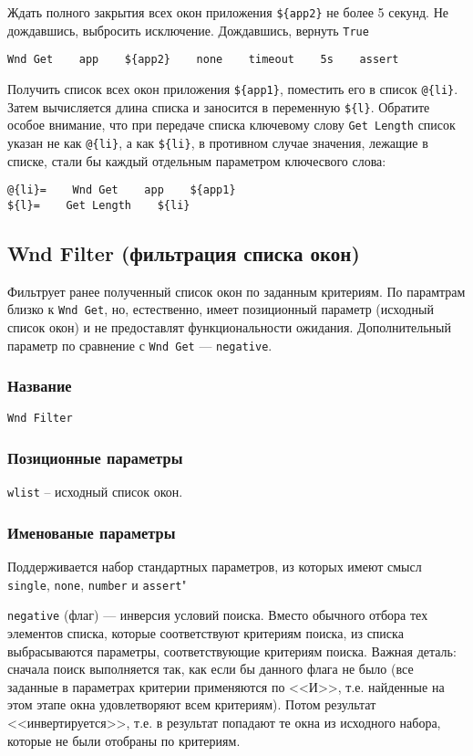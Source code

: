 \documentclass[11pt]{book} %
\begin{document}
Ждать полного закрытия всех окон приложения \verb"${app2}" не более 5 секунд. Не дождавшись, выбросить исключение. Дождавшись, вернуть \verb"True"
\begin{verbatim}
Wnd Get    app    ${app2}    none    timeout    5s    assert
\end{verbatim}

Получить список всех окон приложения \verb"${app1}", поместить его в список \verb"@{li}". Затем вычисляется длина списка и заносится в переменную \verb"${l}". Обратите особое внимание, что при передаче списка ключевому слову \verb"Get Length" список указан не как \verb"@{li}", а как \verb"${li}", в противном случае значения, лежащие в списке, стали бы каждый отдельным параметром ключесвого слова:
\begin{verbatim}
@{li}=    Wnd Get    app    ${app1}
${l}=    Get Length    ${li}
\end{verbatim}



\subsection{Wnd Filter (фильтрация списка окон)}
Фильтрует ранее полученный список окон по заданным критериям. По парамтрам близко к \verb"Wnd Get", но, естественно, имеет позиционный параметр (исходный список окон) и не предоставлят функциональности ожидания. Дополнительный параметр по сравнение с \verb"Wnd Get" --- \verb"negative".

\subsubsection*{Название}
\verb"Wnd Filter"

\subsubsection*{Позиционные параметры} 

\verb"wlist" -- исходный список окон.

\subsubsection*{Именованые параметры} 

Поддерживается набор стандартных параметров, из которых имеют смысл \verb"single", \verb|none|, \verb|number| и \verb"assert""


\verb"negative" (флаг) --- инверсия условий поиска. Вместо обычного отбора тех элементов списка, которые соответствуют критериям поиска, из списка выбрасываются параметры, соответствующие критериям поиска. Важная деталь: сначала поиск выполняется так, как если бы данного флага не было (все заданные в параметрах критерии применяются по <<И>>, т.е. найденные на этом этапе окна удовлетворяют всем критериям). Потом результат <<инвертируется>>, т.е. в результат попадают те окна из исходного набора, которые не были отобраны по критериям.
\end{document}
